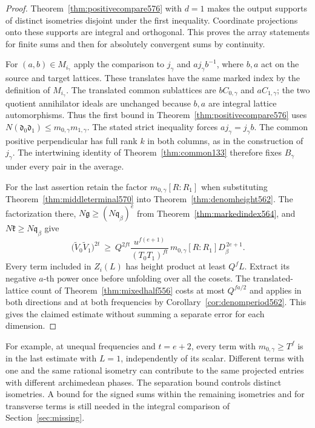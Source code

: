 \documentclass[a4paper,11pt]{article}
\theoremstyle{definition}
\theoremstyle{remark}
\numberwithin{equation}{section}
\begin{document}
\begin{proof}
Theorem~\ref{thm:positivecompare576} with \(d=1\) makes the
output supports of distinct isometries disjoint under the
first inequality. Coordinate projections onto these supports
are integral and orthogonal. This proves the array statements
for finite sums and then for absolutely convergent sums by
continuity.

For \((a,b)\in M_{i_\gamma}\) apply the comparison to
\(j_\gamma\) and \(a j_\gamma b^{-1}\), where \(b,a\) act on
the source and target lattices. These translates have the same
marked index by the definition of \(M_{i_\gamma}\).
The translated common sublattices are \(bC_{0,\gamma}\) and
\(aC_{1,\gamma}\); the two quotient annihilator ideals are
unchanged because \(b,a\) are integral lattice automorphisms.
Thus the first bound in Theorem~\ref{thm:positivecompare576}
uses \(N(\mathfrak d_0\mathfrak d_1)\le m_{0,\gamma}m_{1,\gamma}\).
The stated strict inequality forces \(aj_\gamma=j_\gamma b\).
The common positive perpendicular has full rank \(k\) in both
columns, as in the construction of \(j_\gamma\).
The intertwining identity of Theorem~\ref{thm:common133}
therefore fixes \(B_\gamma\) under every pair in the average.

For the last assertion retain the factor \(m_{0,\gamma}[R:R_1]\)
when substituting Theorem~\ref{thm:middleterminal570} into
Theorem~\ref{thm:denomheight562}. The factorization there,
\(N\mathfrak g\ge (N\mathfrak q_\beta)^e\) from
Theorem~\ref{thm:markedindex564}, and
\(N\mathfrak k\ge N\mathfrak q_\beta\) give
\[
 \big(\widetilde V_0\widetilde V_1\big)^{2t}
   \ \ge\ Q^{2ft}\frac{u^{f(e+1)}}{(T_0T_1)^{ft}}\,
                          m_{0,\gamma}[R:R_1]D_\beta^{\,2e+1}.
\]
Every term included in \(Z_i(L)\) has height product at least
\(Q^fL\). Extract its negative \(a\)-th power once before
unfolding over all the cosets. The translated-lattice count
of Theorem~\ref{thm:mixedhalf556} costs at most \(Q^{fa/2}\)
and applies in both directions and at both frequencies by
Corollary~\ref{cor:denomperiod562}. This gives the claimed
estimate without summing a separate error for each dimension.
\end{proof}

For example, at unequal frequencies and \(t=e+2\), every term
with \(m_{0,\gamma}\ge T^f\) is in the last estimate with
\(L=1\), independently of its scalar. Different terms with
one and the same rational isometry can contribute to the
same projected entries with different archimedean phases.
The separation bound controls distinct isometries. A bound
for the signed sums within the remaining isometries and for
transverse terms is still needed in the integral comparison
of Section~\ref{sec:missing}.
\end{document}
